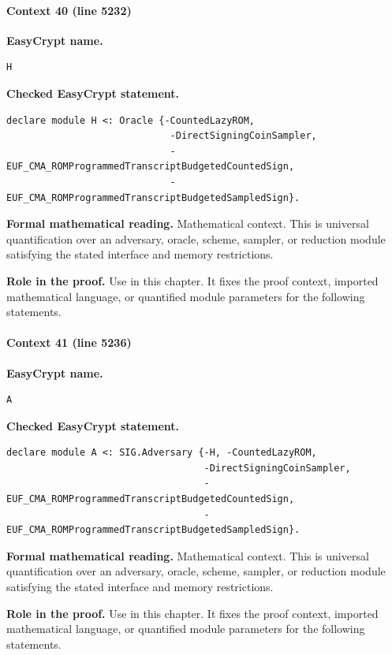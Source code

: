 \paragraph{Context 40 (line 5232)}
\noindent\textbf{EasyCrypt name.}
\begin{lstlisting}[language=EasyCrypt,basicstyle=\ttfamily\scriptsize]
H
\end{lstlisting}
\noindent\textbf{Checked EasyCrypt statement.}
\begin{lstlisting}[language=EasyCrypt,basicstyle=\ttfamily\scriptsize]
declare module H <: Oracle {-CountedLazyROM,
                             -DirectSigningCoinSampler,
                             -EUF_CMA_ROMProgrammedTranscriptBudgetedCountedSign,
                             -EUF_CMA_ROMProgrammedTranscriptBudgetedSampledSign}.
\end{lstlisting}
\noindent\textbf{Formal mathematical reading.}
Mathematical context. This is universal quantification over an adversary, oracle, scheme, sampler, or reduction module satisfying the stated interface and memory restrictions.

\noindent\textbf{Role in the proof.}
Use in this chapter. It fixes the proof context, imported mathematical language, or quantified module parameters for the following statements.

\paragraph{Context 41 (line 5236)}
\noindent\textbf{EasyCrypt name.}
\begin{lstlisting}[language=EasyCrypt,basicstyle=\ttfamily\scriptsize]
A
\end{lstlisting}
\noindent\textbf{Checked EasyCrypt statement.}
\begin{lstlisting}[language=EasyCrypt,basicstyle=\ttfamily\scriptsize]
declare module A <: SIG.Adversary {-H, -CountedLazyROM,
                                   -DirectSigningCoinSampler,
                                   -EUF_CMA_ROMProgrammedTranscriptBudgetedCountedSign,
                                   -EUF_CMA_ROMProgrammedTranscriptBudgetedSampledSign}.
\end{lstlisting}
\noindent\textbf{Formal mathematical reading.}
Mathematical context. This is universal quantification over an adversary, oracle, scheme, sampler, or reduction module satisfying the stated interface and memory restrictions.

\noindent\textbf{Role in the proof.}
Use in this chapter. It fixes the proof context, imported mathematical language, or quantified module parameters for the following statements.


